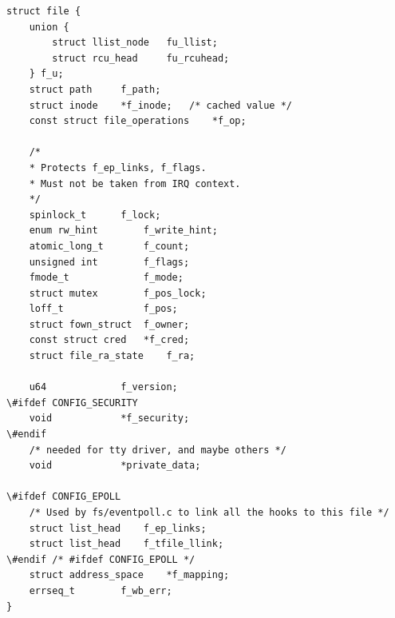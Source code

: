 \begin{lstlisting}[caption=Структура {\ttfamily file}]
struct file {
    union {
        struct llist_node   fu_llist;
        struct rcu_head     fu_rcuhead;
    } f_u;
    struct path     f_path;
    struct inode    *f_inode;   /* cached value */
    const struct file_operations    *f_op;

    /*
    * Protects f_ep_links, f_flags.
    * Must not be taken from IRQ context.
    */
    spinlock_t      f_lock;
    enum rw_hint        f_write_hint;
    atomic_long_t       f_count;
    unsigned int        f_flags;
    fmode_t             f_mode;
    struct mutex        f_pos_lock;
    loff_t              f_pos;
    struct fown_struct  f_owner;
    const struct cred   *f_cred;
    struct file_ra_state    f_ra;

    u64             f_version;
\#ifdef CONFIG_SECURITY
    void            *f_security;
\#endif
    /* needed for tty driver, and maybe others */
    void            *private_data;

\#ifdef CONFIG_EPOLL
    /* Used by fs/eventpoll.c to link all the hooks to this file */
    struct list_head    f_ep_links;
    struct list_head    f_tfile_llink;
\#endif /* #ifdef CONFIG_EPOLL */
    struct address_space    *f_mapping;
    errseq_t        f_wb_err;
}
\end{lstlisting}
